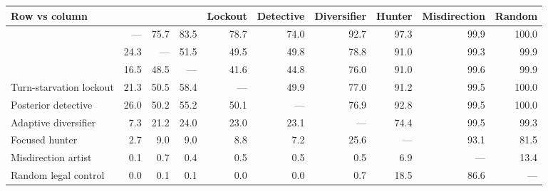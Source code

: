 \begin{tabular}{lrrrrrrrrr}
\toprule
Row vs column & \vfast{} & \vthree{} & \vtwo{} & Lockout & Detective & Diversifier & Hunter & Misdirection & Random \\
\midrule
\vfast{} & --- & 75.7 & 83.5 & 78.7 & 74.0 & 92.7 & 97.3 & 99.9 & 100.0 \\
\vthree{} & 24.3 & --- & 51.5 & 49.5 & 49.8 & 78.8 & 91.0 & 99.3 & 99.9 \\
\vtwo{} & 16.5 & 48.5 & --- & 41.6 & 44.8 & 76.0 & 91.0 & 99.6 & 99.9 \\
Turn-starvation lockout & 21.3 & 50.5 & 58.4 & --- & 49.9 & 77.0 & 91.2 & 99.5 & 100.0 \\
Posterior detective & 26.0 & 50.2 & 55.2 & 50.1 & --- & 76.9 & 92.8 & 99.5 & 100.0 \\
Adaptive diversifier & 7.3 & 21.2 & 24.0 & 23.0 & 23.1 & --- & 74.4 & 99.5 & 99.3 \\
Focused hunter & 2.7 & 9.0 & 9.0 & 8.8 & 7.2 & 25.6 & --- & 93.1 & 81.5 \\
Misdirection artist & 0.1 & 0.7 & 0.4 & 0.5 & 0.5 & 0.5 & 6.9 & --- & 13.4 \\
Random legal control & 0.0 & 0.1 & 0.1 & 0.0 & 0.0 & 0.7 & 18.5 & 86.6 & --- \\
\bottomrule
\end{tabular}